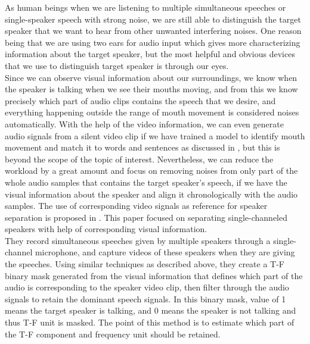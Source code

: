 \documentclass[runningheads,a4paper]{llncs}
\begin{document}
As human beings when we are listening to multiple simultaneous speeches or single-speaker speech with strong noise, we are still able to distinguish the target speaker that we want to hear from other unwanted interfering noises. One reason being that we are using two ears for audio input which gives more characterizing information about the target speaker, but the most helpful and obvious devices that we use to distinguish target speaker is through our eyes.\\
 
Since we can observe visual information about our surroundings, we know when the speaker is talking when we see their mouths moving, and from this we know precisely which part of audio clips contains the speech that we desire, and everything happening outside the range of mouth movement is considered noises automatically. With the help of the video information, we can even generate audio signals from a silent video clip if we have trained a model to identify mouth movement and match it to words and sentences as discussed in \cite{3}, but this is beyond the scope of the topic of interest. Nevertheless, we can reduce the workload by a great amount and focus on removing noises from only part of the whole audio samples that contains the target speaker’s speech, if we have the visual information about the speaker and align it chronologically with the audio samples. The use of corresponding video signals as reference for speaker separation is proposed in \cite{4}. This paper focused on separating single-channeled speakers with help of corresponding visual information.\\
 
They record simultaneous speeches given by multiple speakers through a single-channel microphone, and capture videos of these speakers when they are giving the speeches. Using similar techniques as described above, they create a T-F binary mask generated from the visual information that defines which part of the audio is corresponding to the speaker video clip, then filter through the audio signals to retain the dominant speech signals. In this binary mask, value of 1 means the target speaker is talking, and 0 means the speaker is not talking and thus T-F unit is masked. The point of this method is to estimate which part of the T-F component and frequency unit should be retained.\\
\end{document}
